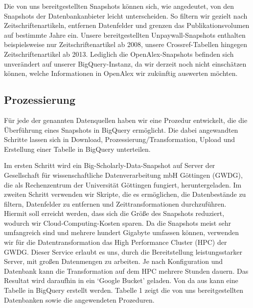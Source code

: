 \documentclass[a4paper,
fontsize=11pt,
oneside,
numbers=noperiodatend,
parskip=half-,
bibliography=totoc,
final
]{scrartcl}
\begin{document}
Die von uns bereitgestellten Snapshots können sich, wie angedeutet, von
den Snapshots der Datenbankanbieter leicht unterscheiden. So filtern wir
gezielt nach Zeitschriftenartikeln, entfernen Datenfelder und grenzen
das Publikationsvolumen auf bestimmte Jahre ein. Unsere bereitgestellten
Unpaywall-Snapshots enthalten beispielsweise nur Zeitschriftenartikel ab
2008, unsere Crossref-Tabellen hingegen Zeitschriftenartikel ab 2013.
Lediglich die OpenAlex-Snapshots befinden sich unverändert auf unserer
BigQuery-Instanz, da wir derzeit noch nicht einschätzen können, welche
Informationen in OpenAlex wir zukünftig auswerten möchten.

\hypertarget{prozessierung}{%
\subsection{Prozessierung}\label{prozessierung}}

Für jede der genannten Datenquellen haben wir eine Prozedur entwickelt,
die die Überführung eines Snapshots in BigQuery ermöglicht. Die dabei
angewandten Schritte lassen sich in Download,
Prozessierung/Transformation, Upload und Erstellung einer Tabelle in
BigQuery unterteilen.

Im ersten Schritt wird ein Big-Scholarly-Data-Snapshot auf Server der
Gesellschaft für wissenschaftliche Datenverarbeitung mbH Göttingen
(GWDG), die als Rechenzentrum der Universität Göttingen fungiert,
heruntergeladen. Im zweiten Schritt verwenden wir Skripte, die es
ermöglichen, die Datenbestände zu filtern, Datenfelder zu entfernen und
Zeittransformationen durchzuführen. Hiermit soll erreicht werden, dass
sich die Größe des Snapshots reduziert, wodurch wir
Cloud-Computing-Kosten sparen. Da die Snapshots meist sehr umfangreich
sind und mehrere hundert Gigabyte umfassen können, verwenden wir für die
Datentransformation das High Performance Cluster (HPC) der GWDG. Dieser
Service erlaubt es uns, durch die Bereitstellung leistungsstarker
Server, mit großen Datenmengen zu arbeiten. Je nach Konfiguration und
Datenbank kann die Transformation auf dem HPC mehrere Stunden dauern.
Das Resultat wird daraufhin in ein \enquote*{Google Bucket} geladen. Von
da aus kann eine Tabelle in BigQuery erstellt werden. Tabelle 1 zeigt
die von uns bereitgestellten Datenbanken sowie die angewendeten
Prozeduren.
\end{document}
